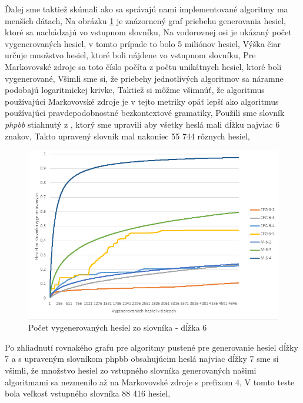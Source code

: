 Ďalej sme taktiež skúmali ako sa správajú nami implementované algoritmy ma menších dátach, Na obrázku \ref{fig:Acc6} je znázornený graf priebehu generovania hesiel, ktoré sa nachádzajú vo vstupnom slovníku, Na vodorovnej osi je ukázaný počet vygenerovaných hesiel, v tomto prípade to bolo 5 miliónov hesiel, Výška čiar určuje množstvo hesiel, ktoré boli nájdene vo vstupnom slovníku, Pre Markovovské zdroje sa toto číslo počíta z počtu unikátnych hesiel, ktoré boli vygenerované, Všimli sme si, že priebehy jednotlivých algoritmov sa náramne podobajú logaritmickej krivke, Taktiež si môžme všimnúť, že algoritmus používajúci Markovovské zdroje je v tejto metriky opäť lepší ako algoritmus používajúci pravdepodobnostné bezkontextové gramatiky, Použili sme slovník \emph{phpbb} stiahnutý z \cite{dictionaries}, ktorý sme upravili aby všetky heslá mali dĺžku najviac 6 znakov, Takto upravený slovník mal nakoniec 55 744 rôznych hesiel,

\begin{figure}[ht]
    \centering
    \includegraphics[width=1\textwidth]{sameDictAcc6}
    \caption{Počet vygenerovaných hesiel zo slovníka - dĺžka 6}
    \label{fig:Acc6}
\end{figure}

Po zhliadnutí rovnakého grafu pre algoritmy pustené pre generovanie hesiel dĺžky 7 a s upraveným slovníkom phpbb obsahujúcim heslá najviac dĺžky 7 sme si všimli, že množstvo hesiel zo vstupného slovníka generovaných našimi algoritmami sa nezmenilo až na Markovovské zdroje s prefixom 4, V tomto teste bola veľkosť vstupného slovníka 88 416 hesiel,

